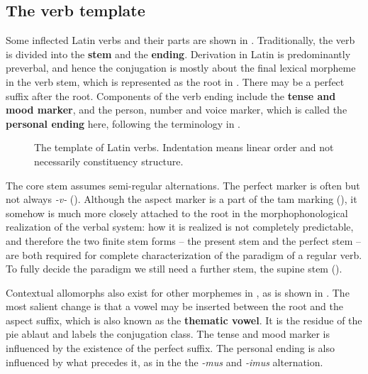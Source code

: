 \documentclass[a4paper, oneside]{report}
\newcommand*{\citesec}[1]{\S~{#1}}
\newcommand*{\citepage}[1]{p.~{#1}}
\newcommand*{\concept}[1]{\textbf{#1}}
\newcommand{\form}[1]{\emph{#1}}
\begin{document}
\subsection{The verb template}

Some inflected Latin verbs and their parts are shown in .
Traditionally, the verb is divided 
into the \concept{stem} and the \concept{ending}.
Derivation in Latin is predominantly preverbal,
and hence the conjugation is mostly about the final lexical morpheme in the verb stem,
which is represented as the root in .
There may be a perfect suffix after the root.
Components of the verb ending include 
the \concept{tense and mood marker},
and the person, number and voice marker,
which is called the \concept{personal ending} here, 
following the terminology in \citet[\citesec{165}]{allen1903allen}.

\begin{figure}[H]
    \centering
    
    \caption{The template of Latin verbs.
    Indentation means linear order and not necessarily constituency structure.}
    \label{fig:latin-verb}
\end{figure}

The core stem assumes semi-regular alternations.
The perfect marker is often but not always \form{-v-} ().
Although the aspect marker is a part of the \acs{tam} marking
(),
it somehow is much more closely attached to the root 
in the morphophonological realization of the verbal system:
how it is realized is not completely predictable,
and therefore the two finite stem forms -- 
the present stem and the perfect stem -- 
are both required for complete characterization of the paradigm of a regular verb.
To fully decide the paradigm 
we still need a further stem, the supine stem
().

Contextual allomorphs also exist for other morphemes in 
\citep[\citepage{11}]{embick2005status},
as is shown in .
The most salient change is that 
a vowel may be inserted between the root and the aspect suffix,
which is also known as the \concept{thematic vowel}.
It is the residue of the \ac{pie} ablaut
and labels the conjugation class.
The tense and mood marker is influenced by the existence of the perfect suffix.
The personal ending is also influenced by what precedes it,
as in the the \form{-mus} and \form{-imus} alternation.
\end{document}
